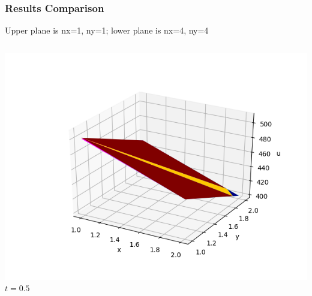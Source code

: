 \documentclass[]{beamer}
\begin{document}
\begin{frame}[t]\frametitle{Results Comparison}
  Upper plane is nx=1, ny=1; lower plane is nx=4, ny=4
  	\begin{columns}
			\begin{center}
			\includegraphics[scale=0.2]{figures/2D_rz_h1m/2D_rz_homog1mat_u_vs_x_05}\\
			\tiny$t=0.5$
			
			\null
			

\end{center}
\end{columns}
\end{frame}
\end{document}
